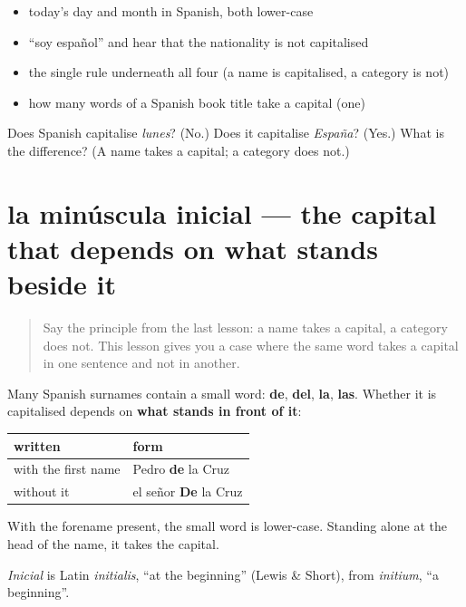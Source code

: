 \begin{itemize}
\raggedright
  \item today's day and month in Spanish, both lower-case
  \item \textquotedblleft{}soy español\textquotedblright{} and hear that the nationality is not capitalised
  \item the single rule underneath all four (a name is capitalised, a category is not)
  \item how many words of a Spanish book title take a capital (one)
\end{itemize}

\begin{tcolorbox}[breakable,colback=teal!4,colframe=teal!35!black,title={Before you move on}]
Does Spanish capitalise \emph{lunes}? (No.) Does it capitalise \emph{España}? (Yes.) What is the difference? (A name takes a capital; a category does not.)
\end{tcolorbox}
\section[la minúscula inicial]{la minúscula inicial — the capital that depends on what stands beside it}

\label{lesson:ES-C426-minuscula-inicial}



\begin{quote}
Say the principle from the last lesson: a name takes a capital, a category does not. This lesson gives you a case where the same word takes a capital in one sentence and not in another.
\end{quote}

\begin{cousinweb}
Many Spanish surnames contain a small word: \textbf{de}, \textbf{del}, \textbf{la}, \textbf{las}. Whether it is capitalised depends on \textbf{what stands in front of it}:

\noindent
\begin{tabularx}{\linewidth}{@{}>{\raggedright\arraybackslash}X>{\raggedright\arraybackslash}X@{}}
\toprule
\textbf{written} & \textbf{form} \\
\midrule
with the first name & Pedro \textbf{de} la Cruz \\
without it & el señor \textbf{De} la Cruz \\
\bottomrule
\end{tabularx}

With the forename present, the small word is lower-case. Standing alone at the head of the name, it takes the capital.

\emph{Inicial} is Latin \emph{initialis}, \textquotedblleft{}at the beginning\textquotedblright{} (Lewis \& Short), from \emph{initium}, \textquotedblleft{}a beginning\textquotedblright{}.
\end{cousinweb}


